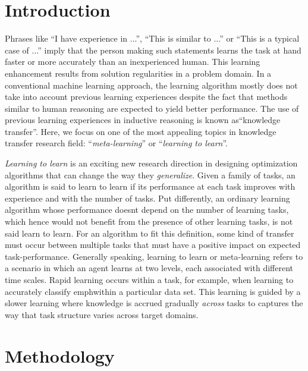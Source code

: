 \documentclass[a4paper, 11pt]{article}
\begin{document}
\section{Introduction}
Phrases like \enquote{I have experience in ...}, \enquote{This is similar to ...} or \enquote{This is a typical case of ...} imply that the person making such statements learns the task at hand faster or more accurately than an inexperienced human. This learning enhancement results from solution regularities in a problem domain. In a conventional machine learning approach, the learning algorithm mostly does not take into account previous learning experiences despite the fact that methods similar to human reasoning are expected to yield better performance. The use of previous learning experiences in inductive reasoning is known as\enquote{knowledge transfer}. Here, we focus on one of the most appealing topics in knowledge transfer research field: \enquote{\textit{meta-learning}} or \enquote{\textit{learning to learn}}.

\emph{Learning to learn} is an exciting new research direction in designing optimization algorithms that can change the way they \emph{generalize}. Given a family of tasks, an algorithm is said to learn to learn if its performance at each task improves with experience and with the number of tasks. Put differently, an ordinary learning algorithm whose performance doesn\textsc{}t depend on the number of learning tasks, which hence would not benefit from the presence of other learning tasks, is not said learn to learn. For an algorithm to fit this definition, some kind of transfer must occur between multiple tasks that must have a positive impact on expected task-performance. Generally speaking, learning to learn or meta-learning refers to a scenario in which an agent learns at two levels, each associated with different time scales. Rapid learning occurs within a task, for example, when learning to accurately classify emph{within} a particular data set. This learning is guided by a slower learning where knowledge is accrued gradually \emph{across} tasks to captures the way that task structure varies across target domains.

\vspace{1.5cm}
\section{Methodology}
\end{document}
